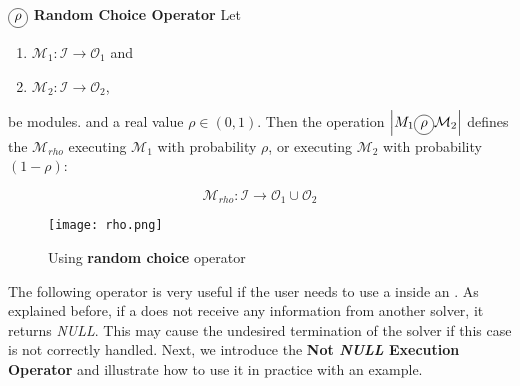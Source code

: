 \begin{definition}\label{op:rho}
$\circled{$\rho$}$ {\bf Random Choice Operator} Let
\begin{enumerate}%
	\item $\mathcal{M}_1 : \mathcal{I} \rightarrow \mathcal{O}_1$ and  
	\item $\mathcal{M}_2 : \mathcal{I} \rightarrow \mathcal{O}_2$,
\end{enumerate}%
be modules. %
and a real value $\rho \in (0,1)$. Then the operation $\left|M_1\circled{$\rho$}\mathcal{M}_2\right|$ defines the \cm{} $\mathcal{M}_{rho}$ executing $\mathcal{M}_1$ with probability $\rho$, or executing $\mathcal{M}_2$ with probability $(1-\rho)$:

\[
\mathcal{M}_{rho}:\mathcal{I} \rightarrow \mathcal{O}_1 \cup \mathcal{O}_2 
\]
\end{definition}


\begin{figure}[h]
	\centering	
	\texttt{[image: rho.png]}
	\caption{Using {\bf random choice} operator}\label{fig:rho_example}
\end{figure}

\separation

The following operator is very useful if the user needs to use a \opch{} inside an \as{}. As explained before, if a \opch{} does not receive any information from another solver, it returns {\it NULL}. This may cause the undesired termination of the solver if this case is not correctly handled. Next, we introduce the \textbf{Not {\it NULL} Execution Operator} and illustrate how to use it in practice with an example.

